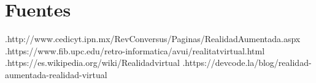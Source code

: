 \section{Fuentes} \noindent
[1].http://www.cedicyt.ipn.mx/RevConversus/Paginas/RealidadAumentada.aspx
\newline
[2].https://www.fib.upc.edu/retro-informatica/avui/realitatvirtual.html \newline
[3].https://es.wikipedia.org/wiki/Realidadvirtual
\newline
[4].https://devcode.la/blog/realidad-aumentada-realidad-virtual

